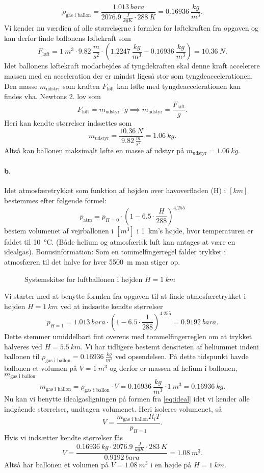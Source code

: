 \documentclass[a4paper]{article}
\begin{document}
\[ 
\rho_{\text{gas i ballon}} = \frac{\qty{1,013}{bara}}{\qty{2076,9}{\frac{J}{kgK}} \cdot \qty{288}{K} } = \qty{0,16936}{\frac{kg}{m^3}} 
.\]
Vi kender nu værdien af alle størrelserne i formlen for løftekraften fra opgaven og kan derfor finde ballonens løftekraft som
\[ 
F_{\text{løft}} = \qty{1}{m^3} \cdot \qty{9,82}{\frac{m}{s^2}} \cdot \left( \qty{1,2247}{\frac{kg}{m^3}} - \qty{0,16936}{\frac{kg}{m^3}} \right) = \qty{10,36}{N}
.\]
Idet ballonens løftekraft modarbejdes af tyngdekraften skal denne kraft accelerere massen med en acceleration der er mindst ligeså stor som tyngdeaccelerationen. Den masse $m_{\text{udstyr}}$ som kraften $F_{\text{løft}}$ kan løfte med tyngdeaccelerationen kan findes vha. Newtons 2. lov som
\[ 
F_{\text{løft}} = m_{\text{udstyr}} \cdot g \implies m_{\text{udstyr}} = \frac{F_{\text{løft}}}{g}
.\]
Heri kan kendte størrelser indsættes som
\[ 
m_{\text{udstyr}} = \frac{\qty{10,36}{N}}{\qty{9,82}{\frac{m}{s^2}}} = \qty{1,06}{kg} 
.\]
Altså kan ballonen maksimalt løfte en masse af udstyr på \underline{\underline{$m_{\text{udstyr}} = \qty{1,06}{kg}$}}.


\paragraph{b.} Idet atmosfæretrykket som funktion af højden over havoverfladen (H) i $[\unit{km}]$ bestemmes efter følgende formel:
\[ 
p_{\text{atm}} = p_{H = 0} \cdot \left( 1 - \num{6,5} \cdot \frac{H}{288} \right)^{\num{4,255}}
\]
bestem volumenet af vejrballonen i $[\unit{m^3}]$ i \qty{1}{km}'s højde, hvor temperaturen er faldet til \qty{10}{\celsius}. (Både helium og atmosfærisk luft kan antages at være en idealgas). Bonusinformation: Som en tommelfingerregel falder trykket i atmosfæren til det halve for hver \qty{5500}{m} man stiger op.
\bigbreak
\begin{figure}[ht]
  \centering
  \caption{Systemskitse for luftballonen i højden $H = \qty{1}{km}$}
  \label{fig:a2-2-2}
\end{figure}
Vi starter med at benytte formlen fra opgaven til at finde atmosfæretrykket i højden $H = \qty{1}{km}$ ved at indsætte kendte størrelser
\[ 
p_{H = 1} = \qty{1,013}{bara} \cdot \left( 1 - \num{6,5} \cdot \frac{1}{288} \right)^{\num{4,255}} = \qty{0,9192}{bara}  
.\]
Dette stemmer umiddelbart fint overens med tommelfingerreglen om at trykket halveres ved $H = \qty{5,5}{km}$. Vi har tidligere bestemt densiteten af heliummet indeni ballonen til $\rho_{\text{gas i ballon}} = \qty{0,16936}{\frac{kg}{m^3}}$ ved opsendelsen. På dette tidspunkt havde ballonen et volumen på $V = \qty{1}{m^3}$ og derfor er massen af helium i ballonen, $m_{\text{gas i ballon}}$
\[ 
m_{\text{gas i ballon}} = \rho_{\text{gas i ballon}} \cdot V = \qty{0,16936}{\frac{kg}{m^3}} \cdot \qty{1}{m^3} = \qty{0,16936}{kg} 
.\]
Nu kan vi benytte idealgasligningen på formen fra \autoref{eq:ideal} idet vi kender alle indgående størrelser, undtagen volumenet. Heri isoleres volumenet, så
\[ 
V = \frac{m_{\text{gas i ballon}} R_i T}{p_{H = 1}}
.\]
Hvis vi indsætter kendte størrelser fås
\[ 
V = \frac{\qty{0,16936}{kg} \cdot \qty{2076,9}{\frac{J}{kg K}} \cdot \qty{283}{K}}{\qty{0,9192}{bara}} = \qty{1,08}{m^3} 
.\]
Altså har ballonen et volumen på \underline{\underline{$V = \qty{1,08}{m^3} $}} i en højde på $H = \qty{1}{km}$.
\end{document}
